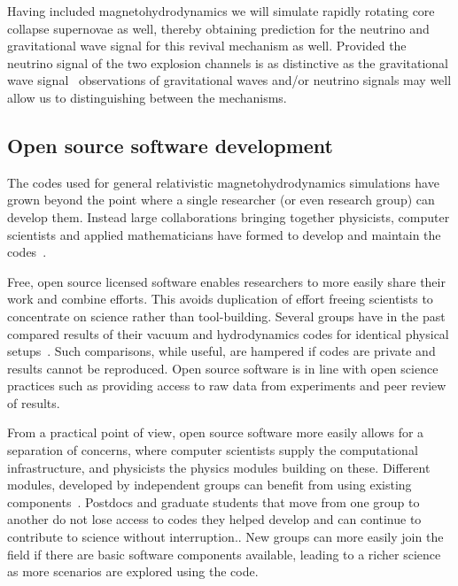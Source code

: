 \documentclass[12pt]{article}
\begin{document}
Having included magnetohydrodynamics we will simulate rapidly rotating core collapse
supernovae as well, thereby obtaining prediction for the neutrino and
gravitational wave signal for this revival mechanism as well. Provided the
neutrino signal of the two explosion channels is as distinctive as the
gravitational wave signal~\cite{2012arXiv1210.6674O} observations of
gravitational waves and/or neutrino signals may well allow us to distinguishing
between the mechanisms.

\subsection{Open source software development}

The codes used
for general relativistic magnetohydrodynamics simulations
have grown beyond the point where a single researcher (or even research group)
can
develop them. Instead large collaborations bringing together physicists,
computer scientists and applied mathematicians have formed to develop and
maintain the
codes~\cite{2012CQGra..29k5001L,SXS:web,astrocodelib:web}.

Free, open source licensed software enables researchers to more easily
share their work and combine efforts.
%
%
This avoids duplication of effort freeing scientists to concentrate on science
rather than tool-building. 
%
Several groups have in the past compared results of their vacuum
and hydrodynamics codes
for identical physical setups~\cite{Babiuc:2007vr,
Baiotti:2010ka}. Such comparisons, while useful, are hampered if codes are
private and results cannot be reproduced. Open source software is in
line with open science practices such as providing access to raw data from
experiments and peer review of results. 

From a practical point of view, open source software more easily allows for a
separation of concerns, where computer scientists supply the computational
infrastructure, and physicists the physics modules building on these.
Different modules, developed by independent groups can benefit from using
existing components~\cite{2012CQGra..29k5001L}. Postdocs and graduate students that
move from one group to another do not lose access to codes they helped
develop and can continue to contribute to science without interruption..
New groups can more easily join the field if there are basic software
components available, leading to a richer science as more scenarios are
explored using the code. 
\end{document}
